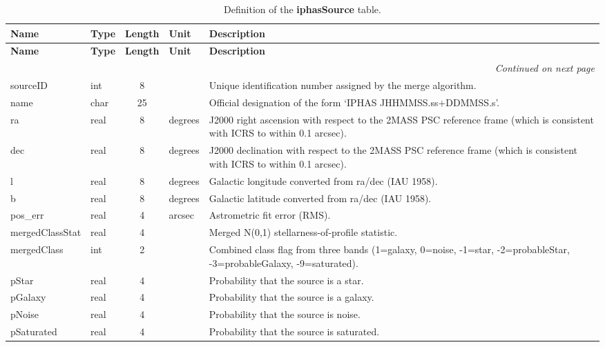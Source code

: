 \documentclass[12pt]{article}
\begin{document}
\begin{center}
\begin{longtable}{llclp{9cm}}
\caption[short]{Definition of the \textbf{iphasSource} table.} \label{iphasSource} \\

\hline \textbf{Name} & \textbf{Type} & \textbf{Length} & \textbf{Unit} & \textbf{Description} \\ \hline
\endfirsthead

\hline \textbf{Name} & \textbf{Type} & \textbf{Length} & \textbf{Unit} & \textbf{Description} \\ \hline
\endhead

\hline \multicolumn{5}{r}{{\it Continued on next page}} \\ 
\endfoot

\hline \hline
\endlastfoot

sourceID & int & 8 &  & Unique identification number assigned by the merge algorithm. \\
name & char & 25 &  & Official designation of the form `IPHAS JHHMMSS.ss+DDMMSS.s'. \\
ra & real & 8 & degrees & J2000 right ascension with respect to the 2MASS PSC reference frame (which is consistent with ICRS to within 0.1 arcsec). \\
dec & real & 8 & degrees & J2000 declination with respect to the 2MASS PSC reference frame (which is consistent with ICRS to within 0.1 arcsec). \\
l & real & 8 & degrees & Galactic longitude converted from ra/dec (IAU 1958). \\
b & real & 8 & degrees & Galactic latitude converted from ra/dec (IAU 1958). \\
pos\_err & real & 4 & arcsec & Astrometric fit error (RMS). \\
mergedClassStat & real & 4 &  & Merged N(0,1) stellarness-of-profile statistic. \\
mergedClass & int & 2 &  & Combined class flag from three bands (1=galaxy, 0=noise, -1=star, -2=probableStar, -3=probableGalaxy, -9=saturated). \\
pStar & real & 4 &  & Probability that the source is a star. \\
pGalaxy & real & 4 &  & Probability that the source is a galaxy. \\
pNoise & real & 4 &  & Probability that the source is noise. \\
pSaturated & real & 4 &  & Probability that the source is saturated. \\


\end{longtable}
\end{center}
\end{document}

